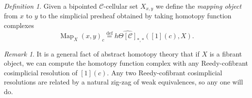 \documentclass[leqno]{article}
\numberwithin{equation}{subsection}
\theoremstyle{plain}   %
\newtheorem{prop}[equation]{Proposition}
\theoremstyle{remark}
\newtheorem{rem}[equation]{Remark}
\newtheorem{defn}[equation]{Definition}
\theoremstyle{plain}
\DeclareMathOperator{\Map}{Map}
\providecommand{\C}{}
\renewcommand{\C}{\ensuremath{\mathcal{C}}}
\newcommand{\defeq}{\overset{\mathrm{def}}=}
\newcommand{\cellset}{\ensuremath{\widehat{\Theta[\mathcal{C}]}}}
\begin{document}
\begin{defn}
	Given a bipointed \(\C\)-cellular set \(X_{x,y}\) we define the \emph{mapping object} from \(x\) to \(y\) to the simplicial presheaf obtained by taking homotopy function complexes
	\[\Map_X(x,y)_c\defeq h\cellset_{\ast,\ast}([1](c), X).\]
\end{defn}
\begin{rem}
	It is a general fact of abstract homotopy theory that if \(X\) is a fibrant object, we can compute the homotopy function complex with any Reedy-cofibrant cosimplicial resolution of \([1](c)\).  Any two Reedy-cofibrant cosimplicial resolutions are related by a natural zig-zag of weak equivalences, so any one will do.
\end{rem}
\begin{comment}
	We define a slightly modified version for special maps.

	\begin{defn}
		If \(G\) is a gadget, let \(\mathcal{G}\) denote the category of all gadgets with special maps between them.  Then we 	define the \emph{special mapping object} to be \[\Map^\mathbf{sp}_G(\alpha,\omega)_c=\mathcal{G}(C^\bullet_R(c),G(c)).\]
	\end{defn}

	\begin{prop}\label{goodgadgets}
		Given a necklace gadget \(T\), the special mapping object \[\Map^\mathbf{sp}_T(\alpha,\omega)\] is contractible.
	\end{prop}
	\begin{proof}
		Since \(T(c)\hookrightarrow \Delta[T](c)\) is a horizontal inner-anodyne and \(\Delta[T](c)\) is fibrant, we can compute \	(\Map^\mathbf{sp}_{T(c)}(\alpha,\omega)\) by the formula 
		\[\Map^\mathbf{sp}_T(\alpha,\omega)_{k,c} = \mathcal{G}(C_R^k(c),\Delta[T](c))\]
		but every map \(C^k_R(c)\to \Delta[T](c)\) factors through the map \(C^n_R(c)\to [1](c),\) and the only special map \([1]	(c)\to \Delta[T](c)\) is the one that maps \(c\) into \(c\times \dots \times c\) via the diagonal.
	\end{proof}

	\section{Comparing \(\mathfrak{C}(X)(x,y)\) with \(\Map_X(x,y)\)}

	We begin by defining a special category of gadgets \(\mathcal{Y}\), which is the full subcategory of the category of all 	gadgets whose objects are those gadgets \(G\) such that \(\Map_G(\alpha,\omega)\) is contractible.


\end{comment}
\end{document}

